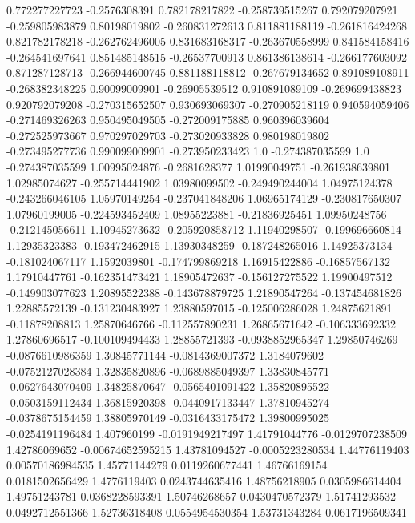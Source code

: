  0.772277227723    -0.2576308391
 0.782178217822  -0.258739515267
 0.792079207921  -0.259805983879
  0.80198019802  -0.260831272613
 0.811881188119  -0.261816424268
 0.821782178218  -0.262762496005
 0.831683168317  -0.263670558999
 0.841584158416  -0.264541697641
 0.851485148515   -0.26537700913
 0.861386138614  -0.266177603092
 0.871287128713  -0.266944600745
 0.881188118812  -0.267679134652
 0.891089108911  -0.268382348225
  0.90099009901   -0.26905539512
 0.910891089109  -0.269699438823
 0.920792079208  -0.270315652507
 0.930693069307  -0.270905218119
 0.940594059406  -0.271469326263
 0.950495049505  -0.272009175885
 0.960396039604  -0.272525973667
 0.970297029703  -0.273020933828
 0.980198019802  -0.273495277736
 0.990099009901  -0.273950233423
            1.0  -0.274387035599
            1.0  -0.274387035599
  1.00995024876    -0.2681628377
  1.01990049751  -0.261938639801
  1.02985074627  -0.255714441902
  1.03980099502  -0.249490244004
  1.04975124378  -0.243266046105
  1.05970149254  -0.237041848206
  1.06965174129  -0.230817650307
  1.07960199005  -0.224593452409
  1.08955223881   -0.21836925451
  1.09950248756  -0.212145056611
  1.10945273632  -0.205920858712
  1.11940298507  -0.199696660814
  1.12935323383  -0.193472462915
  1.13930348259  -0.187248265016
  1.14925373134  -0.181024067117
   1.1592039801  -0.174799869218
  1.16915422886   -0.16857567132
  1.17910447761  -0.162351473421
  1.18905472637  -0.156127275522
  1.19900497512  -0.149903077623
  1.20895522388  -0.143678879725
  1.21890547264  -0.137454681826
  1.22885572139  -0.131230483927
  1.23880597015  -0.125006286028
  1.24875621891   -0.11878208813
  1.25870646766  -0.112557890231
  1.26865671642  -0.106333692332
  1.27860696517  -0.100109494433
  1.28855721393  -0.0938852965347
  1.29850746269  -0.0876610986359
  1.30845771144  -0.0814369007372
   1.3184079602  -0.0752127028384
  1.32835820896  -0.0689885049397
  1.33830845771  -0.0627643070409
  1.34825870647  -0.0565401091422
  1.35820895522  -0.0503159112434
  1.36815920398  -0.0440917133447
  1.37810945274  -0.0378675154459
  1.38805970149  -0.0316433175472
  1.39800995025  -0.0254191196484
    1.407960199  -0.0191949217497
  1.41791044776  -0.0129707238509
  1.42786069652  -0.00674652595215
  1.43781094527  -0.0005223280534
  1.44776119403  0.00570186984535
  1.45771144279  0.0119260677441
  1.46766169154  0.0181502656429
   1.4776119403  0.0243744635416
  1.48756218905  0.0305986614404
  1.49751243781  0.0368228593391
  1.50746268657  0.0430470572379
  1.51741293532  0.0492712551366
  1.52736318408  0.0554954530354
  1.53731343284  0.0617196509341
